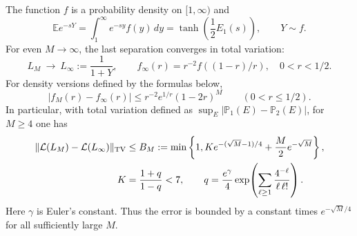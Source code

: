 \documentclass[11pt,letterpaper]{article}
\newcommand{\PP}{\mathbb P}\newcommand{\EE}{\mathbb E}
\begin{document}
\begin{theorem}\label{thm:full-last-law}
The function $f$ is a probability density on $[1,\infty)$ and
\begin{equation}\label{eq:limit-transform}
 \EE e^{-sY}=\int_1^\infty e^{-sy}f(y)\,dy
       =\tanh\!\left(\frac12E_1(s)\right),\qquad Y\sim f.
\end{equation}
For even $M\to\infty$, the last separation converges in total variation:
\[
 L_M\ \longrightarrow\ L_\infty:=\frac1{1+Y},\qquad
 f_\infty(r)=r^{-2}f((1-r)/r),\quad 0<r<1/2.
\]
For density versions defined by the formulas below,
\begin{equation}\label{eq:density-error}
 |f_M(r)-f_\infty(r)|
 \le r^{-2}e^{1/r}(1-2r)^M\qquad(0<r\le1/2).
\end{equation}
In particular, with total variation defined as $\sup_E|\PP_1(E)-\PP_2(E)|$,
for $M\ge4$ one has
\begin{align}
 \|\mathcal L(L_M)-\mathcal L(L_\infty)\|_{\rm TV}
 &\le B_M:=\min\left\{1,
 K e^{-(\sqrt M-1)/4}+\frac M2e^{-\sqrt M}\right\},
 \label{eq:last-TV}\\
 K&=\frac{1+q}{1-q}<7,\qquad
 q=\frac{e^\gamma}{4}\exp\!\left(
       \sum_{\ell\ge1}\frac{4^{-\ell}}{\ell\,\ell!}\right).
 \nonumber
\end{align}
Here $\gamma$ is Euler's constant. Thus the error is bounded by a constant
times $e^{-\sqrt M/4}$ for all sufficiently large $M$.
\end{theorem}
\end{document}
